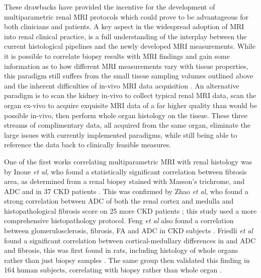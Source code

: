 These drawbacks have provided the incentive for the development of multiparametric renal \ac{MRI} protocols which could prove to be advantageous for both clinicians and patients. A key aspect in the widespread adoption of \ac{MRI} into renal clinical practice, is a full understanding of the interplay between the current histological pipelines and the newly developed \ac{MRI} measurements. While it is possible to correlate biopsy results with \ac{MRI} findings and gain some information as to how different \ac{MRI} measurements vary with tissue properties, this paradigm still suffers from the small tissue sampling volumes outlined above and the inherent difficulties of in-vivo \ac{MRI} data acquisition \cite{leung_could_2017}. An alternative paradigm is to scan the kidney in-vivo to collect typical renal \ac{MRI} data, scan the organ ex-vivo to acquire exquisite \ac{MRI} data of a far higher quality than would be possible in-vivo, then perform whole organ histology on the tissue. These three streams of complimentary data, all acquired from the same organ, eliminate the large issues with currently implemented paradigms, while still being able to reference the data back to clinically feasible measures.


One of the first works correlating multiparametric \ac{MRI} with renal histology was by Inoue \textit{et al}, who found a statistically significant correlation between fibrosis area, as determined from a renal biopsy stained with Masson's trichrome, and \ac{ADC} and \ttwostar in 37 \ac{CKD} patients \cite{inoue_noninvasive_2011}. This was confirmed by Zhao \textit{et al}, who found a strong correlation between \ac{ADC} of both the renal cortex and medulla and histopathological fibrosis score on 25 more \ac{CKD} patients \cite{zhao_assessment_2014}; this study used a more comprehensive histopathology protocol. Feng \textit{et al} also found a correlation between glomerulosclerosis, fibrosis, \ac{FA} and \ac{ADC} in \ac{CKD} subjects \cite{feng_dti_2015}. Friedli \textit{et al} found a significant correlation between cortical-medullary differences in \tone and \ac{ADC} and fibrosis, this was first found in rats, including histology of whole organs rather than just biopsy samples \cite{friedli_new_2016}. The same group then validated this finding in 164 human subjects, correlating with biopsy rather than whole organ \cite{berchtold_validation_2020}.

